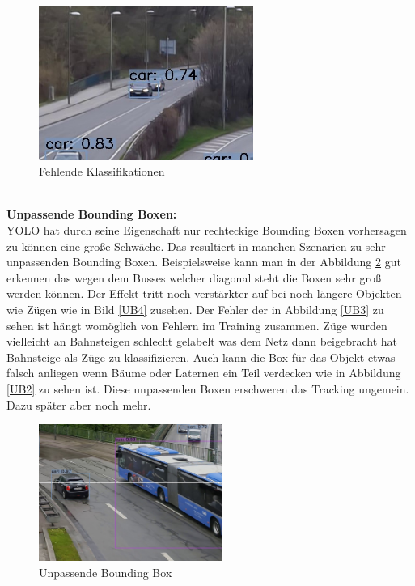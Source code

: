 \documentclass[conference]{IEEEtran}
\begin{document}
	\begin{figure}[!h]
		\begin{center}
			\includegraphics[width=7cm]{Media/Output_108 - Kopie.jpg}
			\caption{Fehlende Klassifikationen}
			\label{FeK2}
		\end{center}
	\end{figure}\\
	\textbf{Unpassende Bounding Boxen:}\\
	YOLO hat durch seine Eigenschaft nur rechteckige Bounding Boxen vorhersagen zu können eine große Schwäche. Das resultiert in manchen Szenarien zu sehr unpassenden Bounding Boxen. Beispielsweise kann man in der Abbildung \ref{UB} gut erkennen das wegen dem Busses welcher diagonal steht die Boxen sehr groß werden können. Der Effekt tritt noch verstärkter auf bei noch längere Objekten wie Zügen wie in Bild \ref{UB4} zusehen. Der Fehler der in Abbildung \ref{UB3} zu sehen ist hängt womöglich von Fehlern im Training zusammen. Züge wurden vielleicht an Bahnsteigen schlecht gelabelt was dem Netz dann beigebracht hat Bahnsteige als Züge zu klassifizieren. Auch kann die Box für das Objekt etwas falsch anliegen wenn Bäume oder Laternen ein Teil verdecken wie in Abbildung \ref{UB2} zu sehen ist. Diese unpassenden Boxen erschweren das Tracking ungemein. Dazu später aber noch mehr.\\
	\begin{figure}[!h]
		\begin{center}
			\includegraphics[width=6cm]{Media/Output_777 - Kopie.jpg}
			\caption{Unpassende Bounding Box}
			\label{UB}
		\end{center}
	\end{figure}
\end{document}
